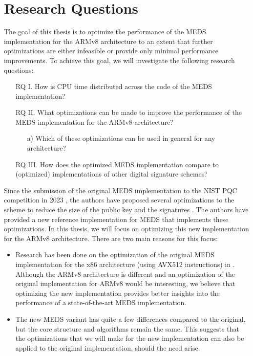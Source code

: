 \documentclass[11pt,a4paper]{report}
\theoremstyle{definition}
\begin{document}
\section{Research Questions}
The goal of this thesis is to optimize the performance of the MEDS implementation for the ARMv8 architecture to an extent that further optimizations are either infeasible or provide only minimal performance improvements. To achieve this goal, we will investigate the following research questions:
\begin{itemize}[left=35pt,labelsep=15pt]
  \item[RQ I.] How is CPU time distributed across the code of the MEDS implementation?
  \item[RQ II.] What optimizations can be made to improve the performance of the MEDS implementation for the ARMv8 architecture?
  \begin{itemize}
    \item[a)] Which of these optimizations can be used in general for any 
    architecture?
  \end{itemize}
  \item[RQ III.] How does the optimized MEDS implementation compare to (optimized) implementations of other digital signature schemes?
\end{itemize}

Since the submission of the original MEDS implementation to the NIST PQC competition in 2023 \cite{chou2023meds}, the authors have proposed several optimizations to the scheme to reduce the size of the public key and the signatures \cite{chou2024reducing}. The authors have provided a new reference implementation for MEDS that implements these optimizations. In this thesis, we will focus on optimizing this new implementation for the ARMv8 architecture. There are two main reasons for this focus:
\begin{itemize}
  \item Research has been done on the optimization of the original MEDS implementation for the x86 architecture (using AVX512 instructions) in \cite{IIS2023LowLevel, IIS2023HighLevel}. Although the ARMv8 architecture is different and an optimization of the original implementation for ARMv8 would be interesting, we believe that optimizing the new implementation provides better insights into the performance of a state-of-the-art MEDS implementation.
  \item The new MEDS variant has quite a few differences compared to the original, but the core structure and algorithms remain the same. This suggests that the optimizations that we will make for the new implementation can also be applied to the original implementation, should the need arise.
\end{itemize}
\end{document}
